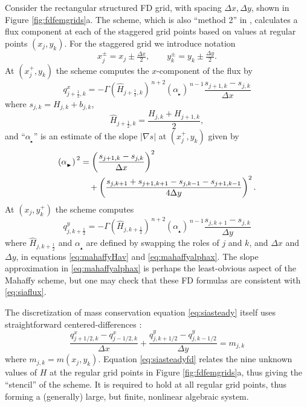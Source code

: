 \documentclass[review,letterpaper]{igs}
\newcommand{\grad}{\nabla}
\newcommand\alpharight{\alpha_{{}_{\blacktriangleright}}}
\newcommand\alphaup{\alpha_{{\!}_{\blacktriangle}}}
\newcommand{\dxtwo}{\tfrac{\Delta x}{2}}
\newcommand{\dytwo}{\tfrac{\Delta y}{2}}
\newcommand{\half}{\tfrac{1}{2}}
\begin{document}
Consider the rectangular structured FD grid, with spacing $\Delta x,\Delta y$, shown in Figure \ref{fig:fdfemgrids}a.  The \cite{Mahaffy1976} scheme, which is also ``method 2'' in \citep{HindmarshPayne1996}, calculates a flux component at each of the staggered grid points based on values at regular points $(x_j,y_k)$.  For the staggered grid we introduce notation
\begin{equation}
x_j^\pm = x_j \pm \dxtwo, \qquad y_k^\pm = y_k \pm \dytwo. \label{eq:definexypm}
\end{equation}
At $(x_j^+,y_k)$ the scheme computes the $x$-component of the flux by
\begin{equation}
q^x_{j+\half,k} = - \Gamma \left(\hat H_{j+\half,k}\right)^{\,n+2} \left(\alpharight\right)^{\,n-1} \frac{s_{j+1,k} - s_{j,k}}{\Delta x}  \label{eq:mahaffyqx}
\end{equation}
where $s_{j,k} = H_{j,k} + b_{j,k}$,
\begin{equation}
  \hat H_{j+\half,k} = \frac{H_{j,k} + H_{j+1,k}}{2},  \label{eq:mahaffyHav}
\end{equation}
and ``$\alpharight$\!'' is an estimate of the slope $|\grad s|$ at $(x_j^+,y_k)$ given by
\begin{align}
\left(\alpharight\right)^{\,2} &= \left(\frac{s_{j+1,k} - s_{j,k}}{\Delta x}\right)^2  \label{eq:mahaffyalphax} \\
  &\quad + \left(\frac{s_{j,k+1} + s_{j+1,k+1} - s_{j,k-1} - s_{j+1,k-1}}{4 \Delta y}\right)^2. \notag
\end{align}
At $(x_j,y_k^+)$ the scheme computes
\begin{equation}
q^y_{j,k+\half} = - \Gamma \left(\hat H_{j,k+\half}\right)^{\,n+2} \left(\alphaup\right)^{\,n-1} \frac{s_{j,k+1} - s_{j,k}}{\Delta y}  \label{eq:mahaffyqy}
\end{equation}
where $\hat H_{j,k+\half}$ and $\alphaup$ are defined by swapping the roles of $j$ and $k$, and $\Delta x$ and $\Delta y$, in equations \eqref{eq:mahaffyHav} and \eqref{eq:mahaffyalphax}.  The slope approximation in \eqref{eq:mahaffyalphax} is perhaps the least-obvious aspect of the Mahaffy scheme, but one may check that these FD formulas are consistent \citep{MortonMayers2005} with \eqref{eq:siaflux}.

The discretization of mass conservation equation \eqref{eq:siasteady} itself uses straightforward centered-differences \citep{MortonMayers2005}:
\begin{equation}
\frac{q^x_{j+1/2,k} - q^x_{j-1/2,k}}{\Delta x} + \frac{q^y_{j,k+1/2}- q^y_{j,k-1/2}}{\Delta y} = m_{j,k}  \label{eq:siasteadyfd}
\end{equation}
where $m_{j,k}=m(x_j,y_k)$.  Equation \eqref{eq:siasteadyfd} relates the nine unknown values of $H$ at the regular grid points in Figure \ref{fig:fdfemgrids}a, thus giving the ``stencil'' of the scheme.  It is required to hold at all regular grid points, thus forming a (generally) large, but finite, nonlinear algebraic system.
\end{document}
